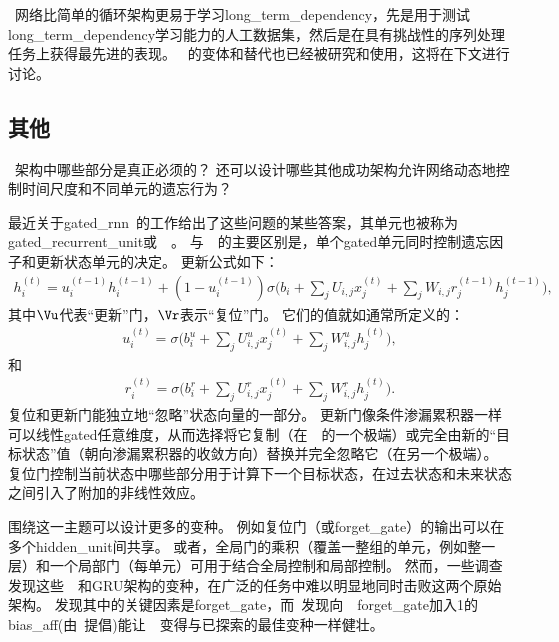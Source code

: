 
~网络比简单的循环架构更易于学习\gls{long_term_dependency}，先是用于测试\gls{long_term_dependency}学习能力的人工数据集\citep{Bengio-trnn94,Hochreiter+Schmidhuber-1997,chapter-gradient-flow-2001}，然后是在具有挑战性的序列处理任务上获得最先进的表现\citep{Graves-book2012,Graves-et-al-ICASSP2013,Sutskever-et-al-NIPS2014}。
~的变体和替代也已经被研究和使用，这将在下文进行讨论。

\subsection{其他}
\label{sec:other_gated_rnns}
~架构中哪些部分是真正必须的？
还可以设计哪些其他成功架构允许网络动态地控制时间尺度和不同单元的遗忘行为？

最近关于\gls{gated_rnn}~的工作给出了这些问题的某些答案，其单元也被称为\gls{gated_recurrent_unit}或~~\citep{cho-al-arxiv14-ssst8,Chung-et-al-NIPSDL2014-small,chung-icml15-gated,Jozefowicz-et-al-ICML2015,Chrupala-et-al-arxiv2015}。
与~~的主要区别是，单个\gls{gated}单元同时控制遗忘因子和更新状态单元的决定。
更新公式如下：
\begin{align}
 h_i^{(t)} = u_i^{(t-1)} h_i^{(t-1)} + (1 - u_i^{(t-1)}) \sigma 
 \Big( b_i + \sum_j U_{i,j} x_j^{(t)} + \sum_j W_{i,j} r_j^{(t-1)} h_j^{(t-1)} \Big),
\end{align}
其中$\Vu$代表``更新''门，$\Vr$表示``复位''门。
它们的值就如通常所定义的：
\begin{align}
 u_i^{(t)} = \sigma \Big( b_i^u + \sum_j U_{i,j}^u x_j^{(t)} + \sum_j W_{i,j}^u h_j^{(t)} \Big),
\end{align}
和
\begin{align}
 r_i^{(t)} = \sigma \Big( b_i^r + \sum_j U_{i,j}^r x_j^{(t)} + \sum_j W_{i,j}^r h_j^{(t)} \Big).
\end{align}
复位和更新门能独立地``忽略''状态向量的一部分。
更新门像条件渗漏累积器一样可以线性\gls{gated}任意维度，从而选择将它复制（在~~的一个极端）或完全由新的``目标状态''值（朝向渗漏累积器的收敛方向）替换并完全忽略它（在另一个极端）。
复位门控制当前状态中哪些部分用于计算下一个目标状态，在过去状态和未来状态之间引入了附加的非线性效应。


围绕这一主题可以设计更多的变种。
例如复位门（或\gls{forget_gate}）的输出可以在多个\gls{hidden_unit}间共享。
或者，全局门的乘积（覆盖一整组的单元，例如整一层）和一个局部门（每单元）可用于结合全局控制和局部控制。
然而，一些调查发现这些~~和GRU架构的变种，在广泛的任务中难以明显地同时击败这两个原始架构\citep{Greff-et-al-arxiv2015,Jozefowicz-et-al-ICML2015}。
\cite{Greff-et-al-arxiv2015}发现其中的关键因素是\gls{forget_gate}，而~\cite{Jozefowicz-et-al-ICML2015}发现向~~\gls{forget_gate}加入1的\gls{bias_aff}(由~\cite{Gers-et-al-2000}提倡)能让~~变得与已探索的最佳变种一样健壮。

